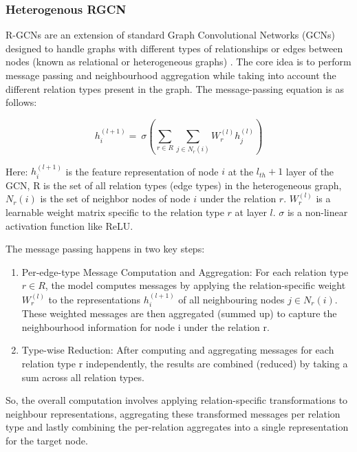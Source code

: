 \documentclass[pdflatex,sn-mathphys-num]{sn-jnl}%
\begin{document}
\subsubsection{Heterogenous RGCN}\label{subsubsec3}

R-GCNs are an extension of standard Graph Convolutional Networks (GCNs) designed to handle graphs with different types of relationships or edges between nodes (known as relational or heterogeneous graphs) \cite{schlichtkrull2018} \cite{fan2023}. The core idea is to perform message passing and neighbourhood aggregation while taking into account the different relation types present in the graph. The message-passing equation is as follows:

\begin{equation}
h_i^{\left(l+1\right)}=\ \sigma\left(\sum_{r\in R}\sum_{j\in N_r\left(i\right)}{W_r^{\left(l\right)}h_j^{\left(l\right)}}\right)
\end{equation}

Here: $h_i^{(l+1)}$  is the feature representation of node $i$ at the $l_{th}+1$ layer of the GCN, R is the set of all relation types (edge types) in the heterogeneous graph, $N_r(i)$ is the set of neighbor nodes of node $i$ under the relation $r$. $W_r^{(l)}$ is a learnable weight matrix specific to the relation type $r$ at layer $l$. $\sigma$  is a non-linear activation function like ReLU.

The message passing happens in two key steps: 

\begin{enumerate} [label=(\roman*),itemsep=10pt]


\item Per-edge-type Message Computation and Aggregation: For each relation type $r \in R$, the model computes messages by applying the relation-specific weight $W_r^{(l)}$ to the representations $h_i^{(l+1)}$ of all neighbouring nodes $j\in N_r(i)$. These weighted messages are then aggregated (summed up) to capture the neighbourhood information for node i under the relation r.

\item Type-wise Reduction: After computing and aggregating messages for each relation type r independently, the results are combined (reduced) by taking a sum across all relation types.

\end{enumerate}

So, the overall computation involves applying relation-specific transformations to neighbour representations, aggregating these transformed messages per relation type and lastly combining the per-relation aggregates into a single representation for the target node.
\end{document}
